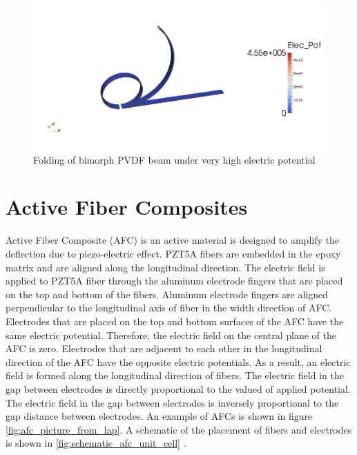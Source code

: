 \begin{figure}
\centering
\includegraphics[trim = 00mm 0mm 00mm 0mm,clip=true,width=7.0in]{./chap_4_structural_analyses/pvdf_folding_beam/folding_pvdf_beam.png}
\caption{Folding of bimorph PVDF beam under very high electric potential}
\label{fig:pvdf_beam_folding} 
\end{figure}


\section{Active Fiber Composites}
Active Fiber Composite (AFC) is an active material is designed to amplify the deflection due to piezo-electric effect.
PZT5A fibers are embedded in the epoxy matrix and are aligned along the longitudinal direction.
The electric field is applied to PZT5A fiber through the aluminum electrode fingers that are placed on the top and bottom of the fibers.
Aluminum electrode fingers are aligned perpendicular to the longitudinal axis of fiber in the width direction of AFC.
Electrodes that are placed on the top and bottom surfaces of the AFC have the same electric potential.
Therefore, the electric field on the central plane of the AFC is zero.
Electrodes that are adjacent to each other in the longitudinal direction of the AFC have the opposite electric potentials.
As a result, an electric field is formed along the longitudinal direction of fibers.
The electric field in the gap between electrodes is directly proportional to the valued of applied potential.
The electric field in the gap between electrodes is inversely proportional to the gap distance between electrodes.
An example of AFCs is shown in figure \ref{fig:afc_picture_from_lap}.
A schematic of the placement of fibers and electrodes is shown in \ref{fig:schematic_afc_unit_cell} \cite{jemai2014mathematical}.


